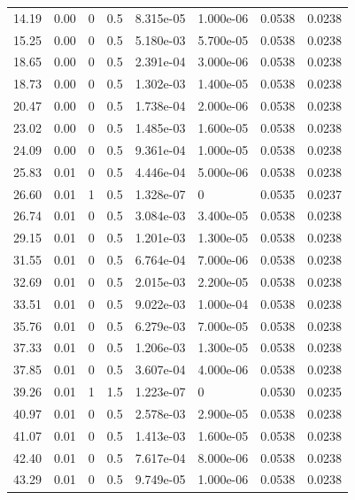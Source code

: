 \documentclass[preview]{standalone}
\begin{document}
{{\begin{tabular}{L{1.2cm}C{1.2cm} C{0.3cm}C{0.5cm} C{1.4cm}C{1.4cm} C{1.4cm}C{1.4cm}}
  14.19  &  0.00  & 0     & 0.5 &  8.315e-05  & 1.000e-06  & 0.0538 &  0.0238   \\ 
  15.25  &  0.00  & 0     & 0.5 &  5.180e-03  & 5.700e-05  & 0.0538 &  0.0238   \\ 
  18.65  &  0.00  & 0     & 0.5 &  2.391e-04  & 3.000e-06  & 0.0538 &  0.0238   \\ 
  18.73  &  0.00  & 0     & 0.5 &  1.302e-03  & 1.400e-05  & 0.0538 &  0.0238   \\ 
  20.47  &  0.00  & 0     & 0.5 &  1.738e-04  & 2.000e-06  & 0.0538 &  0.0238   \\ 
  23.02  &  0.00  & 0     & 0.5 &  1.485e-03  & 1.600e-05  & 0.0538 &  0.0238   \\ 
  24.09  &  0.00  & 0     & 0.5 &  9.361e-04  & 1.000e-05  & 0.0538 &  0.0238   \\ 
  25.83  &  0.01  & 0     & 0.5 &  4.446e-04  & 5.000e-06  & 0.0538 &  0.0238   \\ 
  26.60  &  0.01  & 1     & 0.5 &  1.328e-07  & 0  & 0.0535 &  0.0237   \\ 
  26.74  &  0.01  & 0     & 0.5 &  3.084e-03  & 3.400e-05  & 0.0538 &  0.0238   \\ 
  29.15  &  0.01  & 0     & 0.5 &  1.201e-03  & 1.300e-05  & 0.0538 &  0.0238   \\ 
  31.55  &  0.01  & 0     & 0.5 &  6.764e-04  & 7.000e-06  & 0.0538 &  0.0238   \\ 
  32.69  &  0.01  & 0     & 0.5 &  2.015e-03  & 2.200e-05  & 0.0538 &  0.0238   \\ 
  33.51  &  0.01  & 0     & 0.5 &  9.022e-03  & 1.000e-04  & 0.0538 &  0.0238   \\ 
  35.76  &  0.01  & 0     & 0.5 &  6.279e-03  & 7.000e-05  & 0.0538 &  0.0238   \\ 
  37.33  &  0.01  & 0     & 0.5 &  1.206e-03  & 1.300e-05  & 0.0538 &  0.0238   \\ 
  37.85  &  0.01  & 0     & 0.5 &  3.607e-04  & 4.000e-06  & 0.0538 &  0.0238   \\ 
  39.26  &  0.01  & 1     & 1.5 &  1.223e-07  & 0  & 0.0530 &  0.0235   \\ 
  40.97  &  0.01  & 0     & 0.5 &  2.578e-03  & 2.900e-05  & 0.0538 &  0.0238   \\ 
  41.07  &  0.01  & 0     & 0.5 &  1.413e-03  & 1.600e-05  & 0.0538 &  0.0238   \\ 
  42.40  &  0.01  & 0     & 0.5 &  7.617e-04  & 8.000e-06  & 0.0538 &  0.0238   \\ 
  43.29  &  0.01  & 0     & 0.5 &  9.749e-05  & 1.000e-06  & 0.0538 &  0.0238   \\ 

\end{tabular}}}
\end{document}
